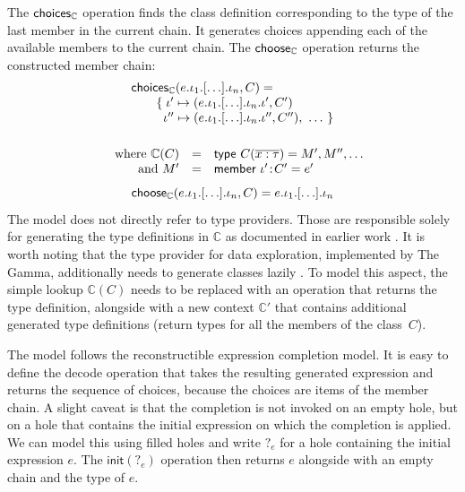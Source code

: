 \documentclass[ a4paper,UKenglish,cleveref, autoref, thm-restate]{lipics-v2021}
\newcommand{\ident}[1]{\textsf{#1}}
\newcommand{\select}{\textnormal{\ident{choose}}}
\newcommand{\choices}{\textnormal{\ident{choices}}}
\begin{document}
The $\choices_\mathbb{C}$ operation finds the class definition corresponding to the type of the
last member in the current chain. It generates choices appending each of the available
members to the current chain. The $\select_\mathbb{C}$ operation returns the constructed
member chain:
\[
\begin{array}{l}
\choices_\mathbb{C}(e . \iota_1 . \lbrack\ldots\rbrack . \iota_n, C) =\\
\qquad \{\; \iota' \mapsto (e . \iota_1 . \lbrack\ldots\rbrack . \iota_n . \iota', C')\\
\qquad \;\; \iota'' \mapsto (e . \iota_1 . \lbrack\ldots\rbrack . \iota_n . \iota'', C''), ~\ldots~\}\\[1em]
\end{array}
\]\vspace{-2em}
\[
\begin{array}{rcl}
\quad \textnormal{where}~\mathbb{C}(C) &=& \ident{type}~C(\overline{x:\tau}) = M', M'', \ldots\\
\quad \textnormal{and}~M' &=& \ident{member}~\iota'\!:\!C'=e'
\end{array}
\]\vspace{-0.5em}
\[
\select_\mathbb{C}(e . \iota_1 . \lbrack\ldots\rbrack . \iota_n, C) = e . \iota_1 . \lbrack\ldots\rbrack . \iota_n
\]
The model does not directly refer to type providers. Those are responsible solely for generating
the type definitions in $\mathbb{C}$ as documented in earlier work \cite{petricek-2016-fsdata}.
It is worth noting that the type provider for data exploration, implemented by The Gamma,
additionally needs to generate classes lazily \cite{petricek-2017-dotdriven}. To model this aspect,
the simple lookup $\mathbb{C}(C)$ needs to be replaced with an operation that returns the type
definition, alongside with a new context $\mathbb{C}'$ that contains additional generated
type definitions (return types for all the members of the class~$C$).

The model follows the reconstructible expression completion model. It is easy to
define the \ident{decode} operation that takes the resulting generated expression and returns the
sequence of choices, because the choices are items of the member chain. A slight caveat is that
the completion is not invoked on an empty hole, but on a hole that contains the initial expression
on which the completion is applied. We can model this using filled holes \cite{omar-2019-holes}
and write $?_e$ for a hole containing the initial expression $e$. The $\ident{init}(?_e)$ operation
then returns $e$ alongside with an empty chain and the type of $e$.
\end{document}
